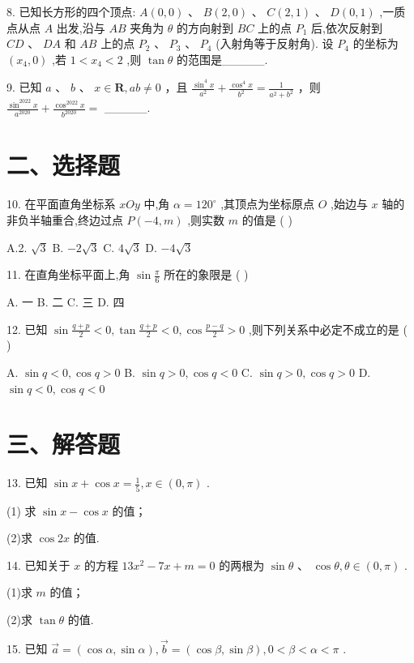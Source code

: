 8. 已知长方形的四个顶点: $A\left( {0,0}\right) \text{ 、 }B\left( {2,0}\right) \text{ 、 }C\left( {2,1}\right) \text{ 、 }D\left( {0,1}\right)$ ,一质点从点 $A$ 出发,沿与 ${AB}$ 夹角为 $\theta$ 的方向射到 ${BC}$ 上的点 ${P}_{1}$ 后,依次反射到 ${CD}\text{ 、 }{DA}$ 和 ${AB}$ 上的点 ${P}_{2}\text{ 、 }{P}_{3}\text{ 、 }{P}_{4}$ (入射角等于反射角). 设 ${P}_{4}$ 的坐标为 $\left( {{x}_{4},0}\right)$ ,若 $1 < {x}_{4} < 2$ ,则 $\tan \theta$ 的范围是\_\_\_\_\_.

9. 已知 $a$ 、 $b$ 、 $x \in  \mathbf{R},{ab} \neq  0$ ，且 $\frac{{\sin }^{4}x}{{a}^{2}} + \frac{{\cos }^{4}x}{{b}^{2}} = \frac{1}{{a}^{2} + {b}^{2}}$ ，则 $\frac{{\sin }^{2022}x}{{a}^{2020}} + \frac{{\cos }^{2022}x}{{b}^{2020}} =$ \_\_\_\_\_.

\section*{二、选择题}

10. 在平面直角坐标系 ${xOy}$ 中,角 $\alpha  = {120}^{ \circ  }$ ,其顶点为坐标原点 $O$ ,始边与 $x$ 轴的非负半轴重合,终边过点 $P\left( {-4,m}\right)$ ,则实数 $m$ 的值是 ( )

A.2. $\sqrt{3}$ B. $- 2\sqrt{3}$ C. $4\sqrt{3}$ D. $- 4\sqrt{3}$

11. 在直角坐标平面上,角 $\sin \frac{\pi }{6}$ 所在的象限是 ( )

A. 一 B. 二 C. 三 D. 四

12. 已知 $\sin \frac{q + p}{2} < 0,\tan \frac{q + p}{2} < 0,\cos \frac{p - q}{2} > 0$ ,则下列关系中必定不成立的是 ( )

A. $\sin q < 0,\cos q > 0$ B. $\sin q > 0,\cos q < 0$ C. $\sin q > 0,\cos q > 0$ D. $\sin q < 0,\cos q < 0$

\section*{三、解答题}

13. 已知 $\sin x + \cos x = \frac{1}{5},x \in  \left( {0,\pi }\right)$ .

(1) 求 $\sin x - \cos x$ 的值；

(2)求 $\cos {2x}$ 的值.

14. 已知关于 $x$ 的方程 ${13}{x}^{2} - {7x} + m = 0$ 的两根为 $\sin \theta \text{ 、 }\cos \theta ,\theta  \in  \left( {0,\pi }\right)$ .

(1)求 $m$ 的值；

(2)求 $\tan \theta$ 的值.

15. 已知 $\overrightarrow{a} = \left( {\cos \alpha ,\sin \alpha }\right) ,\overrightarrow{b} = \left( {\cos \beta ,\sin \beta }\right) ,0 < \beta  < \alpha  < \pi$ .

